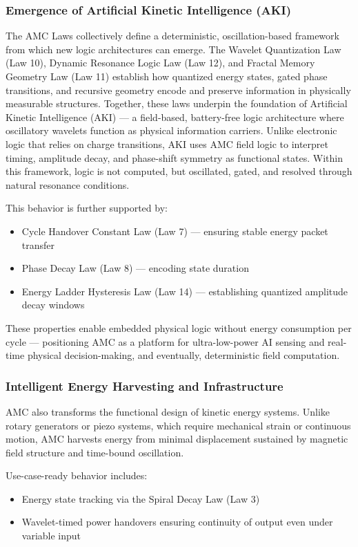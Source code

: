 \documentclass[10pt,aps,pre,onecolumn,superscriptaddress,notitlepage]{revtex4-2}
\begin{document}
\subsubsection{Emergence of Artificial Kinetic Intelligence (AKI)}
The AMC Laws collectively define a deterministic, oscillation-based framework from which new logic architectures can emerge. The Wavelet Quantization Law (Law 10), Dynamic Resonance Logic Law (Law 12), and Fractal Memory Geometry Law (Law 11) establish how quantized energy states, gated phase transitions, and recursive geometry encode and preserve information in physically measurable structures.
Together, these laws underpin the foundation of Artificial Kinetic Intelligence (AKI) — a field-based, battery-free logic architecture where oscillatory wavelets function as physical information carriers. Unlike electronic logic that relies on charge transitions, AKI uses AMC field logic to interpret timing, amplitude decay, and phase-shift symmetry as functional states. Within this framework, logic is not computed, but oscillated, gated, and resolved through natural resonance conditions.

This behavior is further supported by:
\begin{itemize}
    \item Cycle Handover Constant Law (Law 7) — ensuring stable energy packet transfer
    \item Phase Decay Law (Law 8) — encoding state duration
    \item Energy Ladder Hysteresis Law (Law 14) — establishing quantized amplitude decay windows
\end{itemize}
These properties enable embedded physical logic without energy consumption per cycle — positioning AMC as a platform for ultra-low-power AI sensing and real-time physical decision-making, and eventually, deterministic field computation.
\subsubsection{Intelligent Energy Harvesting and Infrastructure}
AMC also transforms the functional design of kinetic energy systems. Unlike rotary generators or piezo systems, which require mechanical strain or continuous motion, AMC harvests energy from minimal displacement sustained by magnetic field structure and time-bound oscillation.

Use-case-ready behavior includes:

\begin{itemize}
    \item Energy state tracking via the Spiral Decay Law (Law 3)
    \item Wavelet-timed power handovers ensuring continuity of output even under variable input
\end{itemize}
\end{document}
